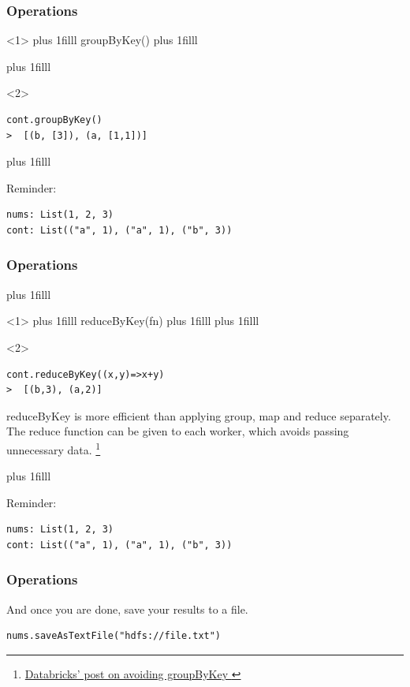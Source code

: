 \documentclass{beamer}
\newcommand{\btVFill}{\vskip0pt plus 1filll}
\begin{document}
\begin{frame}[fragile]
\frametitle{Operations}
\begin{onlyenv}<1>
  \btVFill
{\huge\ttfamily groupByKey()}
  \btVFill
\end{onlyenv}

\btVFill
\begin{onlyenv}<2>
  \begin{lstlisting}[title={Group elements of a list by the first item in the tuple}, numbers=none,basicstyle=\Large\ttfamily,linebackgroundcolor={\btLstHL<2>{1}}]
cont.groupByKey()
>  [(b, [3]), (a, [1,1])]
    \end{lstlisting}
\end{onlyenv}

\btVFill

Reminder:
\begin{lstlisting}[numbers=none,linebackgroundcolor={\color{lightyellow}}]
nums: List(1, 2, 3)
cont: List(("a", 1), ("a", 1), ("b", 3))
\end{lstlisting}

\end{frame}
\begin{frame}[fragile]
\frametitle{Operations}
\btVFill
\begin{onlyenv}<1>
  \btVFill
{\huge \ttfamily reduceByKey(fn)}
  \btVFill
\btVFill
\end{onlyenv}
\begin{onlyenv}<2>
  \begin{lstlisting}[title={Group by key and reduce each value},basicstyle=\huge\ttfamily,basicstyle=\Large\ttfamily,linebackgroundcolor={\btLstHL<2>{1}}]
cont.reduceByKey((x,y)=>x+y) 
>  [(b,3), (a,2)]
\end{lstlisting}
  
reduceByKey is more efficient than applying group, map and reduce separately. The reduce function can be given to each worker, which avoids passing unnecessary data.
\footnote{\href{https://databricks.gitbooks.io/databricks-spark-knowledge-base/content/best_practices/prefer_reducebykey_over_groupbykey.html}{Databricks' post on avoiding groupByKey }}
\end{onlyenv}

\btVFill

Reminder:
\begin{lstlisting}[numbers=none,linebackgroundcolor={\color{lightyellow}}]
nums: List(1, 2, 3)
cont: List(("a", 1), ("a", 1), ("b", 3))
\end{lstlisting}

\end{frame}
\begin{frame}[fragile]
\frametitle{Operations}

And once you are done, save your results to a file.

  \begin{lstlisting}[basicstyle=\Large\ttfamily]
nums.saveAsTextFile("hdfs://file.txt")
  \end{lstlisting}

\end{frame}
\end{document}
